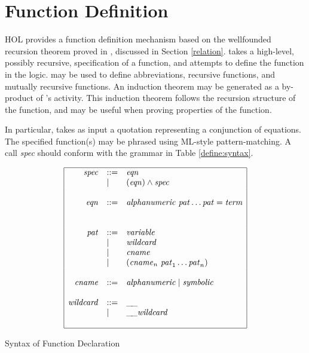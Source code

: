 \section{Function Definition}\label{TFL}

HOL{} provides a function definition mechanism based on the
wellfounded recursion theorem proved in ,
discussed in Section \ref{relation}.   takes a high-level,
possibly recursive, specification of a function, and attempts to
define the function in the logic.  may be used to define
abbreviations, recursive functions, and mutually recursive
functions. An induction theorem may be generated as a by-product of
's activity. This induction theorem follows the recursion
structure of the function, and may be useful when proving properties
of the function.



 In particular,  takes as input a quotation representing a
conjunction of equations. The specified function(s) may be phrased
using ML-style pattern-matching. A call \textit{spec} should conform with the grammar in Table
\ref{define:syntax}.
\begin{table}[htbp]
\begin{center}
\[
\begin{array}{|rll|}
\hline
\mathit{spec} & ::= &  \mathit{eqn} \\
              & \mid  & (\mathit{eqn}) \land \mathit{spec} \\
  & & \\ 
\mathit{eqn} & ::= & \mathit{alphanumeric}\ \mathit{pat} \ldots \mathit{pat} = \mathit{term} \\
  & & \\ 
  & & \\ 
\mathit{pat} & ::= & \mathit{variable} \\
    & \mid   & \mathit{wildcard} \\
    & \mid   & \mathit{cname} \\
    & \mid   & (\mathit{cname}_n\ \mathit{pat}_1 \ldots \mathit{pat}_n) \\
  & & \\ 
\mathit{cname} & ::= & \mathit{alphanumeric} \mid \mathit{symbolic} \\
  & & \\ 
\mathit{wildcard} & ::=  & \_\!\_ \\
                  & \mid & \_\!\_ \mathit{wildcard} \\
  & & \\ 
\hline
\end{array}
\]
\caption{Syntax of Function Declaration}\label{define:syntax}
\end{center}
\end{table}

